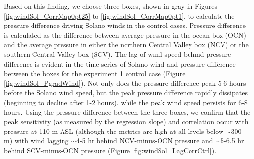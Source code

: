Based on this finding, we choose three boxes, shown in gray in Figures \ref{fig:windSol_CorrMap0pt25} to \ref{fig:windSol_CorrMap0pt1}, to calculate the pressure difference driving Solano winds in the control cases.  Pressure difference is calculated as the difference between average pressure in the ocean box (OCN) and the average pressure in either the northern Central Valley box (NCV) or the southern Central Valley box (SCV).  The lag of wind speed behind pressure difference is evident in the time series of Solano wind and pressure difference between the boxes for the experiment 1 control case (Figure \ref{fig:windSol_PgradWind}).  Not only does the pressure difference peak 5-6 hours before the Solano wind speed, but the peak pressure difference rapidly dissipates (beginning to decline after 1-2 hours), while the peak wind speed persists for 6-8 hours.  Using the pressure difference between the three boxes, we confirm that the peak sensitivity (as measured by the regression slope) and correlation occur with pressure at 110 m ASL (although the metrics are high at all levels below $\sim$300 m) with wind lagging $\sim$4-5 hr behind NCV-minus-OCN pressure and $\sim$5-6.5 hr behind SCV-minus-OCN pressure (Figure \ref{fig:windSol_LagCorrCtrl}).

